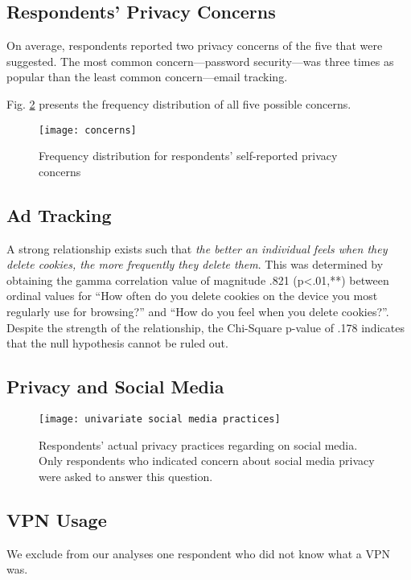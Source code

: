 \documentclass[acmtog]{acmart}
\begin{document}
\subsection{Respondents' Privacy Concerns}
On average, respondents reported two privacy concerns of the five that were
suggested. The most common concern---password security---was three times as
popular than the least common concern---email tracking.

Fig. \ref{Univariate Distribution Respondent Concerns} presents the frequency
distribution of all five possible concerns.

\begin{figure}[H]
    \texttt{[image: concerns]}
    \caption{Frequency distribution for respondents' self-reported privacy
    concerns}
    \label{Univariate Distribution Respondent Concerns}
\end{figure}

\subsection{Ad Tracking}
A strong relationship exists such that \emph{the better an individual feels when
they delete cookies, the more frequently they delete them}. This was determined
by obtaining the gamma correlation value of magnitude .821 (p<.01,**) between
ordinal values for ``How often do you delete cookies on the device you most
regularly use for browsing?'' and ``How do you feel when you delete cookies?''.
Despite the strength of the relationship, the Chi-Square p-value of .178
indicates that the null hypothesis cannot be ruled out.

\subsection{Privacy and Social Media}

\begin{figure}[H]
    \texttt{[image: univariate social media practices]}
    \caption{Respondents' actual privacy practices regarding on social media.
	Only respondents who indicated concern about social media privacy were
	asked to answer this question.}
    \label{Univariate Distribution Respondent Concerns}
\end{figure}

\subsection{VPN Usage}
We exclude from our analyses one respondent who did not know what a VPN was.
\end{document}
